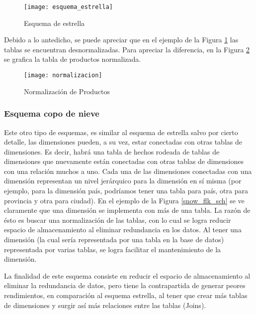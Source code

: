 \documentclass[a4paper,11pt]{article}
\begin{document}
    \begin{figure}
      \begin{center}
        \texttt{[image: esquema\_estrella]}
        \caption{Esquema de estrella} \cite{dim_models}
        \label{star_sch}
      \end{center}
    \end{figure}
    
    
    Debido a lo antedicho, se puede apreciar que en el ejemplo de la Figura \ref{star_sch} las tablas se encuentran desnormalizadas. Para apreciar la
    diferencia, en la Figura \ref{normalizado} se grafica la tabla de productos normalizada.
    
    \begin{figure}
      \begin{center}
        \texttt{[image: normalizacion]}
        \caption{Normalización de Productos} \cite{dim_models}
        \label{normalizado}
      \end{center}
    \end{figure}
    
    
    \subsubsection{Esquema copo de nieve}
    
    Este otro tipo de esquemas, es similar al esquema de estrella salvo por cierto detalle, las dimensiones pueden, a su vez, estar conectadas con otras 
    tablas de dimensiones. Es decir, habrá una tabla de hechos rodeada de tablas de dimensiones que nuevamente están conectadas con otras tablas de 
    dimensiones con una relación muchos a uno. Cada una de las dimensiones conectadas con una dimensión representan un nivel jerárquico para la dimensión en 
    sí misma (por ejemplo, para la dimensión país, podríamos tener una tabla para país, otra para provincia y otra para ciudad). En el ejemplo de la Figura 
    \ref{snow_flk_sch} se ve claramente que una dimensión se implementa con más de una tabla. La razón de ésto es buscar una normalización de las tablas, con 
    lo cual se logra reducir espacio de almacenamiento al eliminar redundancia en los datos. Al tener una dimensión (la cual sería representada por una tabla 
    en la base de datos) representada por varias tablas, se logra facilitar el mantenimiento de la dimensión.\par
    
    La finalidad de este esquema consiste en reducir el espacio de almacenamiento al eliminar la redundancia de datos, pero tiene la contrapartida de generar
    peores rendimientos, en comparación al esquema estrella, al tener que crear más tablas de dimensiones y surgir así más relaciones entre las tablas 
    (Joins).
    
\end{document}
